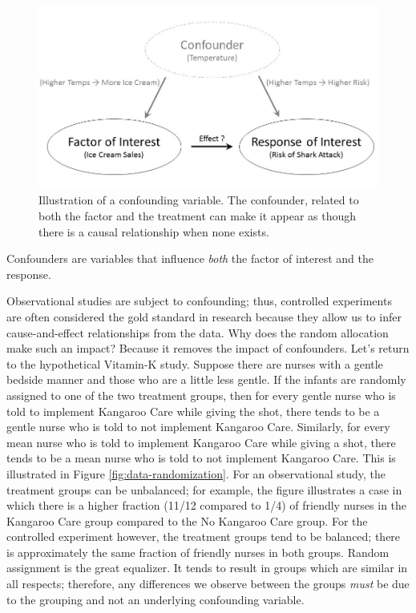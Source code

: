 \documentclass[]{book}
\theoremstyle{plain}
\theoremstyle{mydefn}
\theoremstyle{myexmpl}
\theoremstyle{remark}
\let\BeginKnitrBlock\begin \let\EndKnitrBlock\end
\let\BeginKnitrBlock\begin \let\EndKnitrBlock\end
\begin{document}
\begin{figure}

{\centering \includegraphics[width=0.8\linewidth]{./images/Data-Confounding} 

}

\caption{Illustration of a confounding variable. The confounder, related to both the factor and the treatment can make it appear as though there is a causal relationship when none exists.}\label{fig:data-confounding}
\end{figure}

\BeginKnitrBlock{rmdtip}
Confounders are variables that influence \emph{both} the factor of
interest and the response.
\EndKnitrBlock{rmdtip}

Observational studies are subject to confounding; thus, controlled
experiments are often considered the gold standard in research because
they allow us to infer cause-and-effect relationships from the data. Why
does the random allocation make such an impact? Because it removes the
impact of confounders. Let's return to the hypothetical Vitamin-K study.
Suppose there are nurses with a gentle bedside manner and those who are
a little less gentle. If the infants are randomly assigned to one of the
two treatment groups, then for every gentle nurse who is told to
implement Kangaroo Care while giving the shot, there tends to be a
gentle nurse who is told to not implement Kangaroo Care. Similarly, for
every mean nurse who is told to implement Kangaroo Care while giving a
shot, there tends to be a mean nurse who is told to not implement
Kangaroo Care. This is illustrated in Figure
\ref{fig:data-randomization}. For an observational study, the treatment
groups can be unbalanced; for example, the figure illustrates a case in
which there is a higher fraction (11/12 compared to 1/4) of friendly
nurses in the Kangaroo Care group compared to the No Kangaroo Care
group. For the controlled experiment however, the treatment groups tend
to be balanced; there is approximately the same fraction of friendly
nurses in both groups. Random assignment is the great equalizer. It
tends to result in groups which are similar in all respects; therefore,
any differences we observe between the groups \emph{must} be due to the
grouping and not an underlying confounding variable.
\end{document}
